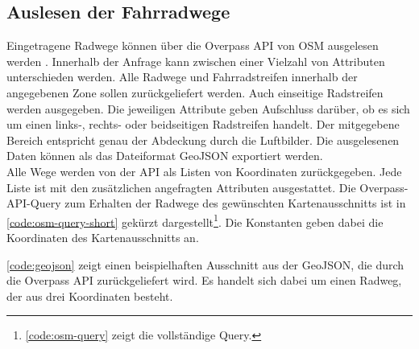 \subsection{Auslesen der Fahrradwege} \label{subsec:overpass-api}

Eingetragene Radwege können über die Overpass API von \ac{OSM} ausgelesen werden \cites{.05.10.2021}{OpenStreetMapcontributors.2017}.
Innerhalb der Anfrage kann zwischen einer Vielzahl von Attributen unterschieden werden.
Alle Radwege und Fahrradstreifen innerhalb der angegebenen Zone sollen zurückgeliefert werden.
Auch einseitige Radstreifen werden ausgegeben. 
Die jeweiligen Attribute geben Aufschluss darüber, ob es sich um einen links-, rechts- oder beidseitigen Radstreifen handelt.
Der mitgegebene Bereich entspricht genau der Abdeckung durch die Luftbilder.
Die ausgelesenen Daten können als das Dateiformat GeoJSON exportiert werden. \\
Alle Wege werden von der API als Listen von Koordinaten zurückgegeben. Jede Liste ist mit den zusätzlichen angefragten 
Attributen ausgestattet. Die Overpass-API-Query zum Erhalten der Radwege des gewünschten Kartenausschnitts ist in 
\autoref{code:osm-query-short} gekürzt dargestellt\footnote{\autoref{code:osm-query} zeigt die vollständige Query.}. 
Die Konstanten geben dabei die Koordinaten des Kartenausschnitts an. 



\autoref{code:geojson} zeigt einen beispielhaften Ausschnitt aus der GeoJSON, die durch die Overpass API 
zurückgeliefert wird. Es handelt sich dabei um einen Radweg, der aus drei Koordinaten besteht. 

\pagebreak



